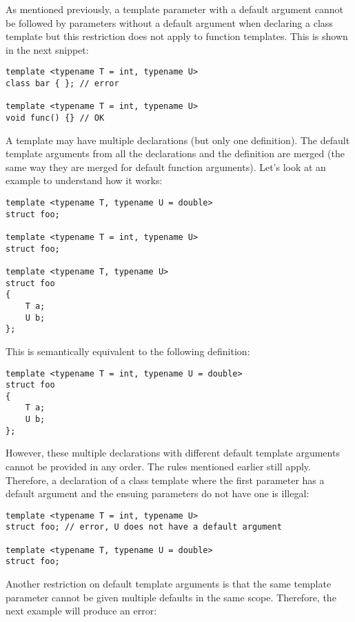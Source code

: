 As mentioned previously, a template parameter with a default argument cannot be followed by parameters without a default argument when declaring a class template but this restriction does not apply to function templates. This is shown in the next snippet:

\begin{lstlisting}[style=styleCXX]
template <typename T = int, typename U>
class bar { }; // error

template <typename T = int, typename U>
void func() {} // OK
\end{lstlisting}

A template may have multiple declarations (but only one definition). The default template arguments from all the declarations and the definition are merged (the same way they are merged for default function arguments). Let's look at an example to understand how it works:

\begin{lstlisting}[style=styleCXX]
template <typename T, typename U = double>
struct foo;

template <typename T = int, typename U>
struct foo;

template <typename T, typename U>
struct foo
{
	T a;
	U b;
};
\end{lstlisting}

This is semantically equivalent to the following definition:

\begin{lstlisting}[style=styleCXX]
template <typename T = int, typename U = double>
struct foo
{
	T a;
	U b;
};
\end{lstlisting}

However, these multiple declarations with different default template arguments cannot be provided in any order. The rules mentioned earlier still apply. Therefore, a declaration of a class template where the first parameter has a default argument and the ensuing parameters do not have one is illegal:

\begin{lstlisting}[style=styleCXX]
template <typename T = int, typename U>
struct foo; // error, U does not have a default argument

template <typename T, typename U = double>
struct foo;
\end{lstlisting}

Another restriction on default template arguments is that the same template parameter cannot be given multiple defaults in the same scope. Therefore, the next example will produce an error:

